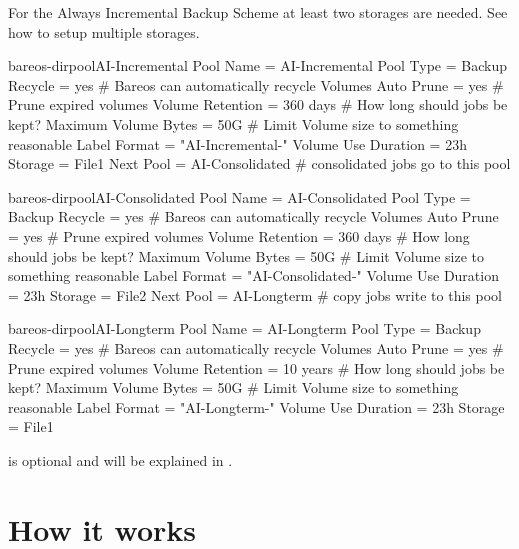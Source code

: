 For the Always Incremental Backup Scheme at least two storages are needed. See  how to setup multiple storages.


\begin{bareosConfigResource}{bareos-dir}{pool}{AI-Incremental}
Pool {
  Name = AI-Incremental
  Pool Type = Backup
  Recycle = yes                       # Bareos can automatically recycle Volumes
  Auto Prune = yes                    # Prune expired volumes
  Volume Retention = 360 days         # How long should jobs be kept?
  Maximum Volume Bytes = 50G          # Limit Volume size to something reasonable
  Label Format = "AI-Incremental-"
  Volume Use Duration = 23h
  Storage = File1
  Next Pool = AI-Consolidated         # consolidated jobs go to this pool
}
\end{bareosConfigResource}

\begin{bareosConfigResource}{bareos-dir}{pool}{AI-Consolidated}
Pool {
  Name = AI-Consolidated
  Pool Type = Backup
  Recycle = yes                       # Bareos can automatically recycle Volumes
  Auto Prune = yes                    # Prune expired volumes
  Volume Retention = 360 days         # How long should jobs be kept?
  Maximum Volume Bytes = 50G          # Limit Volume size to something reasonable
  Label Format = "AI-Consolidated-"
  Volume Use Duration = 23h
  Storage = File2
  Next Pool = AI-Longterm             # copy jobs write to this pool
}
\end{bareosConfigResource}

\begin{bareosConfigResource}{bareos-dir}{pool}{AI-Longterm}
Pool {
  Name = AI-Longterm
  Pool Type = Backup
  Recycle = yes                       # Bareos can automatically recycle Volumes
  Auto Prune = yes                    # Prune expired volumes
  Volume Retention = 10 years         # How long should jobs be kept?
  Maximum Volume Bytes = 50G          # Limit Volume size to something reasonable
  Label Format = "AI-Longterm-"
  Volume Use Duration = 23h
  Storage = File1
}
\end{bareosConfigResource}

 is optional and will be explained in .

\section{How it works}

